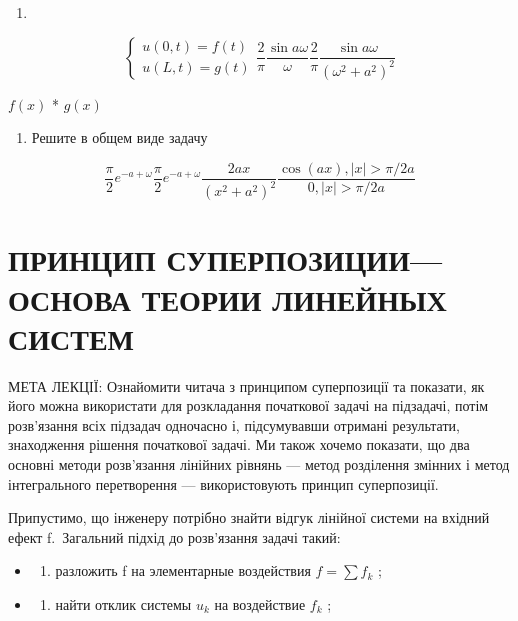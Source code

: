 \documentclass[
  ukrainian,
]{article}
\providecommand{\tightlist}{%
  \setlength{\itemsep}{0pt}\setlength{\parskip}{0pt}}
\begin{document}
\begin{enumerate}
\def\labelenumi{\arabic{enumi}.}
\setcounter{enumi}{8}
\tightlist
\item
\end{enumerate}

\[
\begin{cases} u(0, t) = f(t) \\ u(L, t) = g(t) \end{cases}
\frac{2}{\pi} \frac{\sin a\omega}{\omega}
\frac{2}{\pi} \frac{\sin a\omega}{(\omega^2+a^2)^2}
\]

\(f(x)\) * \(g(x)\)

\begin{enumerate}
\def\labelenumi{\arabic{enumi}.}
\setcounter{enumi}{1}
\tightlist
\item
  Решите в общем виде задачу
\end{enumerate}

\[
\frac{\pi}{2} e^{-a+\omega}
\frac{\pi}{2} e^{-a+\omega}
\frac{2ax}{(x^2+a^2)^2}
\frac{\cos(ax), |x| > \pi/2a}{0, |x| > \pi/2a}
\]

\section{ПРИНЦИП СУПЕРПОЗИЦИИ--- ОСНОВА ТЕОРИИ ЛИНЕЙНЫХ
СИСТЕМ}\label{ux43fux440ux438ux43dux446ux438ux43f-ux441ux443ux43fux435ux440ux43fux43eux437ux438ux446ux438ux438-ux43eux441ux43dux43eux432ux430-ux442ux435ux43eux440ux438ux438-ux43bux438ux43dux435ux439ux43dux44bux445-ux441ux438ux441ux442ux435ux43c}

МЕТА ЛЕКЦІЇ: Ознайомити читача з принципом суперпозиції та показати, як
його можна використати для розкладання початкової задачі на підзадачі,
потім розв'язання всіх підзадач одночасно і, підсумувавши отримані
результати, знаходження рішення початкової задачі. Ми також хочемо
показати, що два основні методи розв'язання лінійних рівнянь --- метод
розділення змінних і метод інтегрального перетворення --- використовують
принцип суперпозиції.

Припустимо, що інженеру потрібно знайти відгук лінійної системи на
вхідний ефект f.~Загальний підхід до розв'язання задачі такий:

\begin{itemize}
\tightlist
\item
  \begin{enumerate}
  \def\labelenumi{\arabic{enumi})}
  \tightlist
  \item
    разложить f на элементарные воздействия \(f = \sum f_k\) ;
  \end{enumerate}
\item
  \begin{enumerate}
  \def\labelenumi{\arabic{enumi})}
  \setcounter{enumi}{1}
  \tightlist
  \item
    найти отклик системы \(u_k\) на воздействие \(f_k\) ;
  \end{enumerate}
\end{itemize}
\end{document}
